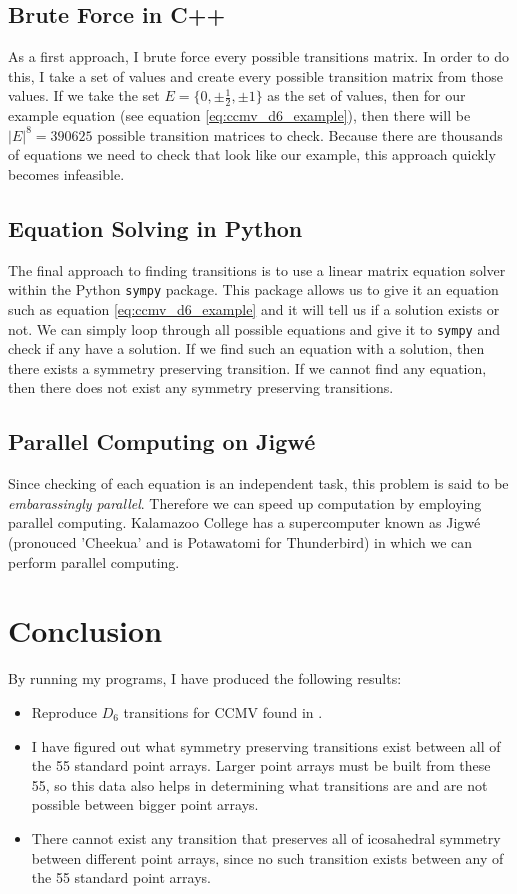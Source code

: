\documentclass[a4paper,10pt]{article}
\theoremstyle{plain}
\theoremstyle{definition}
\theoremstyle{remark}
\newcommand\abs[1]{\left|#1\right|}
\begin{document}
\subsection{Brute Force in C++}
As a first approach, I brute force every possible transitions matrix.
In order to do this, I take a set of values and create every possible transition matrix from those values.
If we take the set \(E = \{0, \pm\frac{1}{2}, \pm 1\}\) as the set of values, then for our example equation (see equation \ref{eq:ccmv_d6_example}), then there will be \(\abs{E}^8 = 390625\) possible transition matrices to check.
Because there are thousands of equations we need to check that look like our example, this approach quickly becomes infeasible.

\subsection{Equation Solving in Python}
The final approach to finding transitions is to use a linear matrix equation solver within the Python \texttt{sympy} package.
This package allows us to give it an equation such as equation \ref{eq:ccmv_d6_example} and it will tell us if a solution exists or not.
We can simply loop through all possible equations and give it to \texttt{sympy} and check if any have a solution.
If we find such an equation with a solution, then there exists a symmetry preserving transition.
If we cannot find any equation, then there does not exist any symmetry preserving transitions.

\subsection{Parallel Computing on Jigwé}
Since checking of each equation is an independent task, this problem is said to be \emph{embarassingly parallel}.
Therefore we can speed up computation by employing parallel computing.
Kalamazoo College has a supercomputer known as Jigwé (pronouced 'Cheekua' and is Potawatomi for Thunderbird) in which we can perform parallel computing.

\section{Conclusion}
By running my programs, I have produced the following results:
\begin{itemize}
    \item Reproduce \(D_6\) transitions for CCMV found in \cite{indelicatoetal2012}.
    \item I have figured out what symmetry preserving transitions exist between all of the 55 standard point arrays. Larger point arrays must be built from these 55, so this data also helps in determining what transitions are and are not possible between bigger point arrays.
    \item There cannot exist any transition that preserves all of icosahedral symmetry between different point arrays, since no such transition exists between any of the 55 standard point arrays.
\end{itemize}
\end{document}
